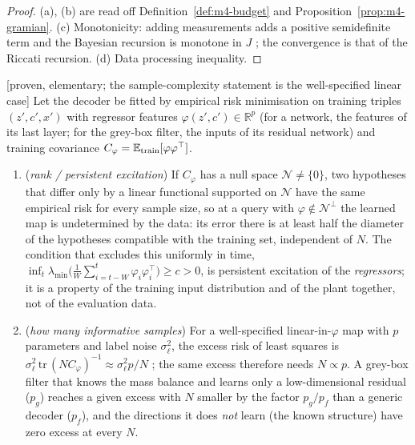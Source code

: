 \begin{proof}
(a), (b) are read off Definition~\ref{def:m4-budget} and Proposition~\ref{prop:m4-gramian}. (c) Monotonicity:
adding measurements adds a positive semidefinite term and the Bayesian recursion is monotone in $J$
\citep{tichavsky1998posterior}; the convergence is that of the Riccati recursion. (d) Data processing inequality.
\end{proof}

\begin{proposition}\label{prop:m4-learning}
[proven, elementary; the sample-complexity statement is the well-specified linear case] Let the decoder be fitted by
empirical risk minimisation on training triples $(z',c',x')$ with regressor features $\varphi(z',c')\in\mathbb R^p$
(for a network, the features of its last layer; for the grey-box filter, the inputs of its residual network) and
training covariance $C_\varphi=\mathbb E_{\rm train}[\varphi\varphi^\top]$.
\begin{enumerate}
\item[(a)] (\emph{rank / persistent excitation}) If $C_\varphi$ has a null space $\mathcal N\ne\{0\}$, two
hypotheses that differ only by a linear functional supported on $\mathcal N$ have the same empirical risk for every
sample size, so at a query with $\varphi\notin\mathcal N^\perp$ the learned map is undetermined by the data: its
error there is at least half the diameter of the hypotheses compatible with the training set, independent of $N$.
The condition that excludes this uniformly in time, $\inf_t\lambda_{\min}\big(\tfrac1W\sum_{i=t-W}^t\varphi_i\varphi_i^\top\big)\ge c>0$,
is persistent excitation of the \emph{regressors}; it is a property of the training input distribution and of
the plant together, not of the evaluation data.
\item[(b)] (\emph{how many informative samples}) For a well-specified linear-in-$\varphi$ map with $p$ parameters
and label noise $\sigma_\ell^2$, the excess risk of least squares is $\sigma_\ell^2\,\mathrm{tr}\,(N C_\varphi)^{-1}\approx\sigma_\ell^2p/N$
\citep[Ch.~3]{hastie2009elements}; the same excess therefore needs $N\propto p$. A grey-box filter that knows the
mass balance and learns only a low-dimensional residual ($p_g$) reaches a given excess with $N$ smaller by the
factor $p_g/p_f$ than a generic decoder ($p_f$), and the directions it does \emph{not} learn (the known structure)
have zero excess at every $N$.
\end{enumerate}
\end{proposition}
